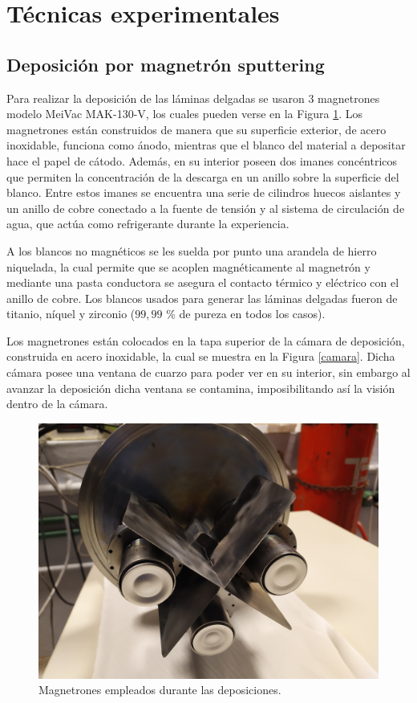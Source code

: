 \documentclass[12pt]{article}
\theoremstyle{definition}
\theoremstyle{remark}
\begin{document}
\newpage

\section{Técnicas experimentales}

\subsection{Deposición por magnetrón sputtering}
Para realizar la deposición de las láminas delgadas se usaron 3 magnetrones modelo MeiVac MAK-130-V, los cuales pueden verse en la Figura \ref{magnetrones}. Los magnetrones están construidos de manera que su superficie exterior, de acero inoxidable, funciona como ánodo, mientras que el blanco del material a depositar hace el papel de cátodo. Además, en su interior poseen dos imanes concéntricos que permiten la concentración de la descarga en un anillo sobre la superficie del blanco. Entre estos imanes se encuentra una serie de cilindros huecos aislantes y un anillo de cobre conectado a la fuente de tensión y al sistema de circulación de agua, que actúa como refrigerante durante la experiencia.

A los blancos no magnéticos se les suelda por punto una arandela de hierro niquelada, la cual permite que se acoplen magnéticamente al magnetrón y mediante una pasta conductora se asegura el contacto térmico y eléctrico con el anillo de cobre. Los blancos usados para generar las láminas delgadas fueron de titanio, níquel y zirconio ($99,99$ \% de pureza en todos los casos).


Los magnetrones están colocados en la tapa superior de la cámara de  deposición, construida en acero inoxidable, la cual se muestra en la Figura \ref{camara}. Dicha cámara posee una ventana de cuarzo para poder ver en su interior, sin embargo al avanzar la deposición dicha ventana se contamina, imposibilitando así la visión dentro de la cámara.

\begin{figure}[H]
	\centering
	\includegraphics[scale=0.1]{img/magnetrones.jpg}
	\caption{Magnetrones empleados durante las deposiciones.}
	\label{magnetrones}
\end{figure}
\end{document}
